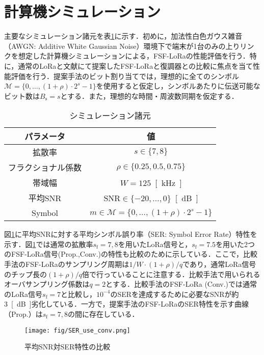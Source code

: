 \documentclass[technicalreport]{ieicej}
\begin{document}
\section{計算機シミュレーション}
主要なシミュレーション諸元を表\ref{tab:awgn-ser-simu-gen}に示す．初めに，加法性白色ガウス雑音（AWGN: Additive White Gaussian Noise）環境下で端末が1台のみの上りリンクを想定した計算機シミュレーションによる，FSF-LoRaの性能評価を行う．特に，通常のLoRaと文献\cite{GC3}にて提案したFSF-LoRaと復調器との比較に焦点を当て性能評価を行う．提案手法のビット割り当てでは，理想的に全てのシンボル$\mathcal{M}=\{0,\ldots,(1+\rho)\cdot 2^s-1\}$を使用すると仮定し，シンボルあたりに伝送可能なビット数は$B_\mathrm{s}=s$とする．また，理想的な時間・周波数同期を仮定する．
\begin{table}[t]
\centering
\caption{シミュレーション諸元}
\label{tab:awgn-ser-simu-gen}
\begin{tabular}{c|c}\hline
パラメータ&値\\\hline
拡散率& $s\in \{7, 8\}$\\
フラクショナル係数&$\rho\in\{0.25, 0.5, 0.75\}$\\
帯域幅&{$W=125$\ \si{[kHz]}}\\
平均SNR&$\mathrm{SNR}\in\{-20,\dots,0\}$\ \si{[dB]}\\
Symbol&$m\in\mathcal{M}=\{0, \dots, (1+\rho)\cdot2^{s}-1\}$\\\hline
\end{tabular}
\end{table}



図\ref{fig:SNR-SER-conv}に平均SNRに対する平均シンボル誤り率（SER: Symbol Error Rate）特性を示す．図\ref{fig:SNR-SER-conv}では通常の拡散率$s_\mathrm{f}=7,8$を用いたLoRa信号と，$s_\mathrm{f}=7.5$を用いた2つのFSF-LoRa信号(Prop.,Conv.\cite{GC3})の特性も比較のために示している．ここで，比較手法のFSF-LoRaのサンプリング周期は$1/W\cdot(1+\rho)/q $であり，通常LoRa信号のチップ長の$(1+\rho)/q$倍で行っていることに注意する．比較手法で用いられるオーバサンプリング係数は$q=2$とする．比較手法のFSF-LoRa (Conv.)では通常のLoRa信号$s_\mathrm{f}=7$と比較し，$10^{-4}$のSERを達成するために必要なSNRが約\SI{3}{[dB]}劣化している．一方で，提案手法のFSF-LoRaのSER特性を示す曲線（Prop.）は$s_\mathrm{f}=7,8$の間に存在している．

\begin{figure}[t] 
\centering
\texttt{[image: fig/SER\_use\_conv.png]}
\caption{平均SNR対SER特性の比較}
\label{fig:SNR-SER-conv}
\end{figure}
\end{document}
